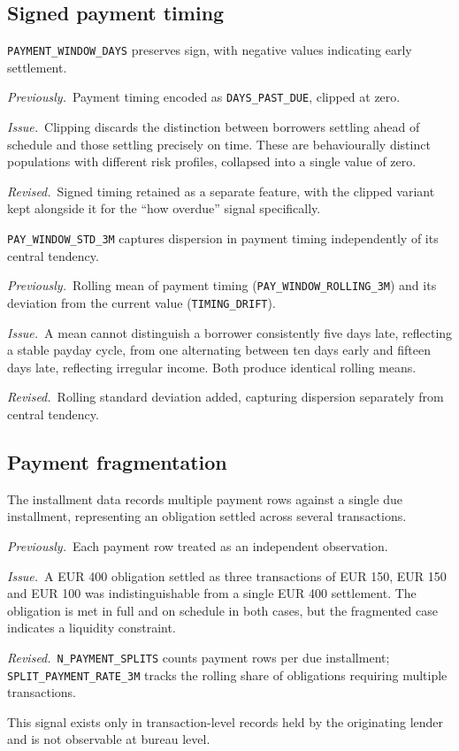 \documentclass[11pt,a4paper]{article}
\newcommand{\designnote}[3]{%
  \par\vspace{7pt}
  \begin{list}{}{%
    \setlength{\leftmargin}{2em}\setlength{\rightmargin}{1em}%
    \setlength{\labelwidth}{0pt}\setlength{\labelsep}{0pt}%
    \setlength{\itemsep}{2pt}\setlength{\topsep}{0pt}%
    \setlength{\parsep}{0pt}}
    \item[]\textit{Previously.}~#1
    \item[]\textit{Issue.}~#2
    \item[]\textit{Revised.}~#3
  \end{list}
  \par\vspace{7pt}
}
\begin{document}
\subsection{Signed payment timing}

\texttt{PAYMENT\_\allowbreak WINDOW\_\allowbreak DAYS} preserves sign, with negative values indicating early
settlement.

\designnote{Payment timing encoded as \texttt{DAYS\_PAST\_DUE}, clipped at zero.}
{Clipping discards the distinction between borrowers settling ahead of schedule and those
settling precisely on time. These are behaviourally distinct populations with different
risk profiles, collapsed into a single value of zero.}
{Signed timing retained as a separate feature, with the clipped variant kept alongside it
for the ``how overdue'' signal specifically.}

\texttt{PAY\_WINDOW\_STD\_3M} captures dispersion in payment timing independently of its
central tendency.

\designnote{Rolling mean of payment timing (\texttt{PAY\_\allowbreak WINDOW\_\allowbreak ROLLING\_3M}) and its
deviation from the current value (\texttt{TIMING\_DRIFT}).}
{A mean cannot distinguish a borrower consistently five days late, reflecting a stable
payday cycle, from one alternating between ten days early and fifteen days late,
reflecting irregular income. Both produce identical rolling means.}
{Rolling standard deviation added, capturing dispersion separately from central tendency.}

\subsection{Payment fragmentation}

The installment data records multiple payment rows against a single due installment,
representing an obligation settled across several transactions.

\designnote{Each payment row treated as an independent observation.}
{A EUR 400 obligation settled as three transactions of EUR 150, EUR 150 and EUR 100 was
indistinguishable from a single EUR 400 settlement. The obligation is met in full and on
schedule in both cases, but the fragmented case indicates a liquidity constraint.}
{\texttt{N\_PAYMENT\_SPLITS} counts payment rows per due installment;
\texttt{SPLIT\_\allowbreak PAYMENT\_\allowbreak RATE\_3M} tracks the rolling share of obligations requiring
multiple transactions.}

This signal exists only in transaction-level records held by the originating lender and
is not observable at bureau level.
\end{document}

